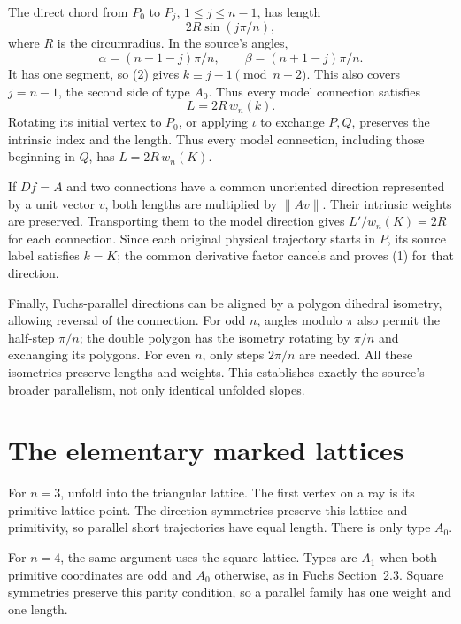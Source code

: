\documentclass[11pt]{article}
\begin{document}
The direct chord from \(P_0\) to \(P_j\), \(1\le j\le n-1\), has length
\[
2R\sin(j\pi/n),
\tag{11}
\]
where \(R\) is the circumradius. In the source's angles,
\[
\alpha=(n-1-j)\pi/n,\qquad
\beta=(n+1-j)\pi/n.
\]
It has one segment, so (2) gives \(k\equiv j-1\pmod{n-2}\). This also covers \(j=n-1\), the second side of type \(A_0\). Thus every model connection satisfies
\[
L=2R\,w_n(k).
\tag{12}
\]
Rotating its initial vertex to \(P_0\), or applying \(\iota\) to exchange \(P,Q\), preserves the intrinsic index and the length. Thus every model connection, including those beginning in \(Q\), has \(L=2R\,w_n(K)\).

If \(D f=A\) and two connections have a common unoriented direction represented by a unit vector \(v\), both lengths are multiplied by \(\|Av\|\). Their intrinsic weights are preserved. Transporting them to the model direction gives \(L'/w_n(K)=2R\) for each connection. Since each original physical trajectory starts in \(P\), its source label satisfies \(k=K\); the common derivative factor cancels and proves (1) for that direction.

Finally, Fuchs-parallel directions can be aligned by a polygon dihedral isometry, allowing reversal of the connection. For odd \(n\), angles modulo \(\pi\) also permit the half-step \(\pi/n\); the double polygon has the isometry rotating by \(\pi/n\) and exchanging its polygons. For even \(n\), only steps \(2\pi/n\) are needed. All these isometries preserve lengths and weights. This establishes exactly the source's broader parallelism, not only identical unfolded slopes.

\section{The elementary marked lattices}

For \(n=3\), unfold into the triangular lattice. The first vertex on a ray is its primitive lattice point. The direction symmetries preserve this lattice and primitivity, so parallel short trajectories have equal length. There is only type \(A_0\).

For \(n=4\), the same argument uses the square lattice. Types are \(A_1\) when both primitive coordinates are odd and \(A_0\) otherwise, as in Fuchs Section~2.3. Square symmetries preserve this parity condition, so a parallel family has one weight and one length.
\end{document}
